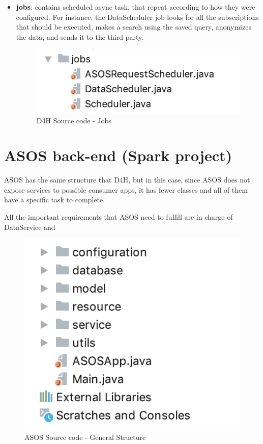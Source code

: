\documentclass[a4paper, hidelinks, 12pt]{report}
\begin{document}
\begin{itemize}
		\item \textbf{jobs}: contains scheduled async task, that repeat according to how they were configured. For instance, the DataScheduler job looks for all the subscriptions that should be executed, makes a search using the saved query, anonymizes the data, and sends it to the third party.

	\begin{figure}[H]
		\centering
		\includegraphics[scale=0.6]{images/backend/d4h_source_code_jobs.png}
		\caption[D4H Source code - Jobs]{D4H Source code - Jobs}
		\label{fig:d4h_source_code_jobs}
	\end{figure}
	\end{itemize}

\section{ASOS back-end (Spark project)}
ASOS has the same structure that D4H, but in this case, since ASOS does not expose services to possible consumer apps, it has fewer classes and all of them have a specific task to complete.

All the important requirements that ASOS need to fulfill are in charge of DataService and

	\begin{figure}[H]
		\centering
		\includegraphics[scale=0.6]{images/backend/asos_source_code_structure.png}
		\caption[ASOS Source code - General Structure]{ASOS Source code - General Structure}
		\label{fig:asos_source_code_structure}
	\end{figure}
\end{document}
